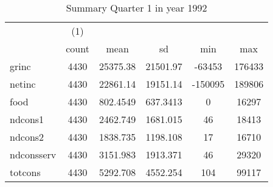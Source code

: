 \begin{table}[htbp]\centering
\def\sym#1{\ifmmode^{#1}\else\(^{#1}\)\fi}
\caption{Summary Quarter 1 in year 1992 \label{sum\_Q1\_y1992}}
\begin{tabular}{l*{1}{ccccc}}
\hline\hline
            &\multicolumn{1}{c}{(1)}&            &            &            &            \\
            &       count&        mean&          sd&         min&         max\\
\hline
grinc       &        4430&    25375.38&    21501.97&      -63453&      176433\\
netinc      &        4430&    22861.14&    19151.14&     -150095&      189806\\
food        &        4430&    802.4549&    637.3413&           0&       16297\\
ndcons1     &        4430&    2462.749&    1681.015&          46&       18413\\
ndcons2     &        4430&    1838.735&    1198.108&          17&       16710\\
ndconsserv  &        4430&    3151.983&    1913.371&          46&       29320\\
totcons     &        4430&    5292.708&    4552.254&         104&       99117\\
\hline\hline
\end{tabular}
\end{table}
